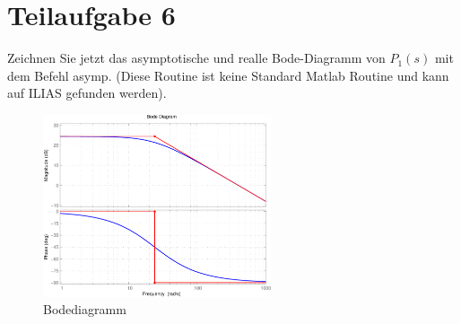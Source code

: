 \section{Teilaufgabe 6}
\begin{aufgabe}
    Zeichnen Sie jetzt das asymptotische und realle Bode-Diagramm von $P_1(s)$ 
    mit dem Befehl asymp. (Diese Routine ist keine Standard Matlab Routine und 
    kann auf ILIAS gefunden werden).
\end{aufgabe}
\begin{figure}[h!]
    \centering
    \includegraphics[width=0.6\textwidth]{06/asymp_plot.pdf}
    \caption{Bodediagramm}
    \label{fig:06plot}
\end{figure}

